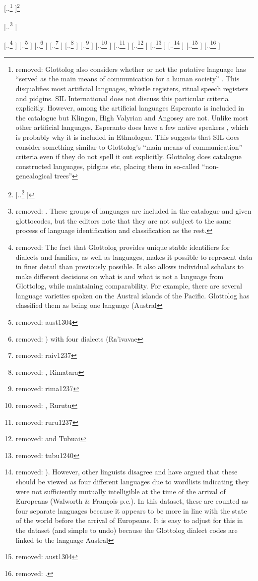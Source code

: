 \documentclass[unnumsec,webpdf,modern,medium]{oup-authoring-template}
\providecommand{\DIFdeltex}[1]{{\protect\color{red} [..\footnote{removed: #1} ]}} %
\providecommand{\DIFdel}[1]{\texorpdfstring{\DIFdeltex{#1}}{}} %
\begin{document}
\DIFdel{Glottolog also considers whether or not the putative language has ``served as the main means of communication for a human society'' \citep{glottologlanguoids}. This disqualifies most artificial languages, whistle registers, ritual speech registers and pidgins. SIL International does not discuss this particular criteria explicitly. However, among the artificial languages Esperanto is included in the catalogue but  Klingon, High Valyrian and Angosey are not. Unlike most other artificial languages,  Esperanto does have a few native speakers \citep{bergen2001nativization}, which is probably why it is included in Ethnologue. This suggests that SIL does consider something similar to Glottolog's ``main means of communication'' criteria even if they do not spell it out explicitly. Glottolog does catalogue constructed languages, pidgins etc, placing them in so-called ``non-genealogical trees''}\footnote{\DIFdel{The list of non-genealogical trees in Glottolog are: Sign Language, Unclassifiable, Pidgin, Unattested (data missing), Mixed Language, Artificial Language and Speech Register.}}%
\addtocounter{footnote}{-1}%
\DIFdel{. These groups of languages are included in the catalogue and given glottocodes, but the editors note that they are not subject to the same process of language identification and classification as the rest.%
}%

\DIFdel{The fact that Glottolog provides unique stable identifiers for dialects and families, as well as languages, makes it possible to represent data in finer detail than previously possible. It also allows individual scholars to make different decisions on what is and what is not a language from Glottolog, while maintaining comparability. For example, there are several language varieties spoken on the Austral islands of the Pacific. Glottolog has classified them as being one language (Austral }%
\DIFdel{aust1304}%
\DIFdel{) with four dialects (Ra'ivavae }%
\DIFdel{raiv1237}%
\DIFdel{, Rimatara }%
\DIFdel{rima1237}%
\DIFdel{, Rurutu }%
\DIFdel{ruru1237}%
\DIFdel{and Tubuai }%
\DIFdel{tubu1240}%
\DIFdel{). However, other linguists disagree and have argued that these should be viewed as four different languages due to wordlists indicating they were not sufficiently mutually intelligible at the time of the arrival of Europeans (Walworth \& François p.c.). In this dataset, these are counted as four separate languages because it appears to be more in line with the state of the world before the arrival of Europeans. It is easy to adjust for this in the dataset (and simple to undo) because the Glottolog dialect codes are linked to the language Austral }%
\DIFdel{aust1304}%
\DIFdel{. 
}%
\end{document}
